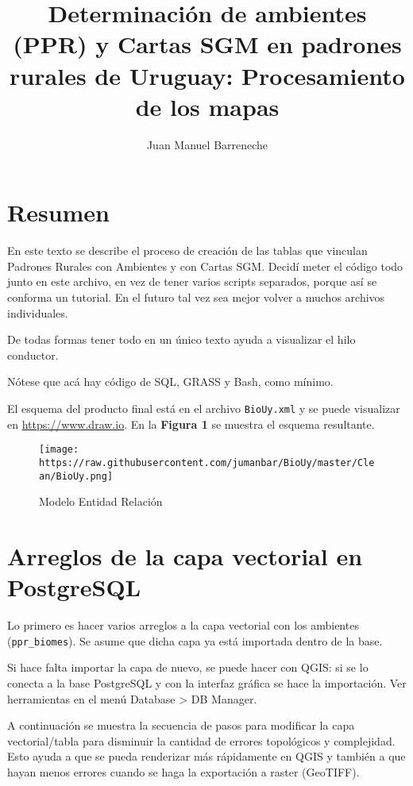 \documentclass[spanish,]{article}
\title{Determinación de ambientes (PPR) y Cartas SGM en padrones rurales de
Uruguay: Procesamiento de los mapas}
\author{Juan Manuel Barreneche}
\date{}
\begin{document}
\maketitle

\section{Resumen}\label{resumen}

En este texto se describe el proceso de creación de las tablas que
vinculan Padrones Rurales con Ambientes y con Cartas SGM. Decidí meter
el código todo junto en este archivo, en vez de tener varios scripts
separados, porque así se conforma un tutorial. En el futuro tal vez sea
mejor volver a muchos archivos individuales.

De todas formas tener todo en un único texto ayuda a visualizar el hilo
conductor.

Nótese que acá hay código de SQL, GRASS y Bash, como mínimo.

El esquema del producto final está en el archivo \texttt{BioUy.xml} y se
puede visualizar en \href{https://www.draw.io/}{https://www.draw.io}. En
la \textbf{Figura 1} se muestra el esquema resultante.

\begin{figure}[htbp]
\centering
\texttt{[image: https://raw.githubusercontent.com/jumanbar/BioUy/master/Clean/BioUy.png]}
\caption{Modelo Entidad Relación}
\end{figure}

\newpage

\section{Arreglos de la capa vectorial en
PostgreSQL}\label{arreglos-de-la-capa-vectorial-en-postgresql}

Lo primero es hacer varios arreglos a la capa vectorial con los
ambientes (\texttt{ppr\_biomes}). Se asume que dicha capa ya está
importada dentro de la base.

Si hace falta importar la capa de nuevo, se puede hacer con QGIS: si se
lo conecta a la base PostgreSQL y con la interfaz gráfica se hace la
importación. Ver herramientas en el menú Database \textgreater{} DB
Manager.

A continuación se muestra la secuencia de pasos para modificar la capa
vectorial/tabla para disminuir la cantidad de errores topológicos y
complejidad. Esto ayuda a que se pueda renderizar más rápidamente en
QGIS y también a que hayan menos errores cuando se haga la exportación a
raster (GeoTIFF).
\end{document}
